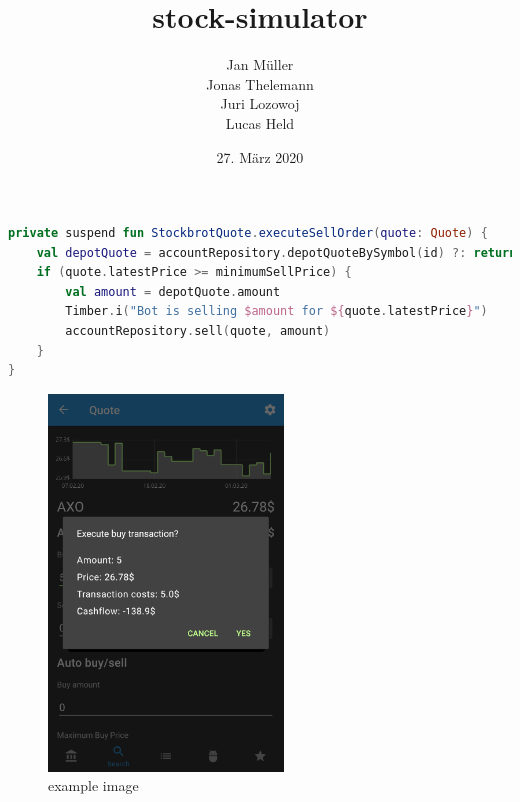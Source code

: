 \documentclass[a4paper]{article}
\begin{document}
\title{\textbf{stock-simulator}}
\author{
    Jan Müller\\
    Jonas Thelemann\\
    Juri Lozowoj\\
    Lucas Held
}
\date{27. März 2020}
\maketitle

\pagebreak
\tableofcontents
\pagebreak

\begin{lstlisting}[caption={example kotlin code}, captionpos=b, label={lst:example}, language=Kotlin]
private suspend fun StockbrotQuote.executeSellOrder(quote: Quote) {
    val depotQuote = accountRepository.depotQuoteBySymbol(id) ?: return
    if (quote.latestPrice >= minimumSellPrice) {
        val amount = depotQuote.amount
        Timber.i("Bot is selling $amount for ${quote.latestPrice}")
        accountRepository.sell(quote, amount)
    }
}
\end{lstlisting}

\begin{figure}[H]
    \centering
    \includegraphics[height=10cm,keepaspectratio]{./images/quote_buy_confirmation_dialog.png}
    \caption{example image}
    \label{fig:example}
\end{figure}

\pagebreak
\end{document}
